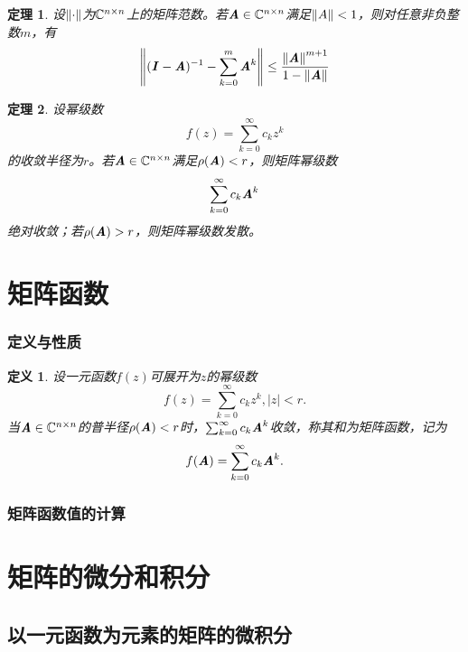 \documentclass[UTF8]{ctexart}
\newtheorem{defi}{定义}
\newtheorem{thm}{定理}
\begin{document}
\begin{thm}
    设$\left\lVert\cdot\right\rVert$为$\mathbb{C}^{n \times n}$上的矩阵范数。若$\boldsymbol{\mathit{A}} \in \mathbb{C}^{n \times n}$满足$\left\lVert A\right\rVert < 1$，则对任意非负整数$m$，有
    \[
        \left\lVert(\boldsymbol{\mathit{I}} - \boldsymbol{\mathit{A}})^{-1} - \sum_{k=0}^m \boldsymbol{\mathit{A}}^k\right\rVert \le \frac{\left\lVert\boldsymbol{\mathit{A}}\right\rVert^{m+1}}{1-\left\lVert\boldsymbol{\mathit{A}}\right\rVert}
    \]
\end{thm}


\begin{thm}
   设幂级数
    \[
        f(z) = \sum_{k=0}^{\infty} c_kz^k
    \]
的收敛半径为$r$。若$\boldsymbol{\mathit{A}} \in \mathbb{C}^{n \times n}$满足$\rho(\boldsymbol{\mathit{A}}) < r$，则矩阵幂级数
    \[
        \sum_{k=0}^{\infty} c_k\boldsymbol{\mathit{A}}^k
    \]
绝对收敛；若$\rho(\boldsymbol{\mathit{A}})>r$，则矩阵幂级数发散。
\end{thm}

\section{矩阵函数}
\label{sec:ju_zhen_han_shu_}

\subsubsection{定义与性质}
\label{ssub:ding_yi_yu_xing_zhi_}

\begin{defi}
    设一元函数$f(z)$可展开为$z$的幂级数
    \[
        f(z) = \sum_{k=0}^{\infty} c_kz^k, |z| < r.
    \]
当$\boldsymbol{\mathit{A}} \in \mathbb{C}^{n \times n}$的普半径$\rho(\boldsymbol{\mathit{A}}) < r$时，$\sum_{k=0}^{\infty} c_k\boldsymbol{\mathit{A}}^k$收敛，称其和为矩阵函数，记为
    \[
        f(\boldsymbol{\mathit{A}}) = \sum_{k=0}^{\infty} c_k\boldsymbol{\mathit{A}}^k.
    \]
\end{defi}
\subsubsection{矩阵函数值的计算}
\label{ssub:ju_zhen_han_shu_zhi_de_ji_suan_}


\section{矩阵的微分和积分}
\label{sec:ju_zhen_de_wei_fen_he_ji_fen_}

\subsection{以一元函数为元素的矩阵的微积分}
\label{sub:yi_yi_yuan_han_shu_wei_yuan_su_de_ju_zhen_de_wei_ji_fen_}
\end{document}
